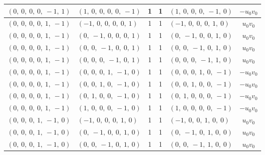 \documentclass[11pt]{article}
\theoremstyle{definition}
\begin{document}
\begin{longtable}{|l|l|c|c|l|c|}
    \hline
    $\left( 0, \  0, \  0, \  0, \  -1, \  1\right)$ & $\left( 1, \  0, \  0, \  0, \  0, \  -1\right)$ & 1 & 1 & $\left( 1, \  0, \  0, \  0, \  -1, \  0\right)$ & $- u_{0} v_{0}$ \\
    \hline
    $\left( 0, \  0, \  0, \  0, \  1, \  -1\right)$ & $\left( -1, \  0, \  0, \  0, \  0, \  1\right)$ & 1 & 1 & $\left( -1, \  0, \  0, \  0, \  1, \  0\right)$ & $u_{0} v_{0}$ \\
    \hline
    $\left( 0, \  0, \  0, \  0, \  1, \  -1\right)$ & $\left( 0, \  -1, \  0, \  0, \  0, \  1\right)$ & 1 & 1 & $\left( 0, \  -1, \  0, \  0, \  1, \  0\right)$ & $u_{0} v_{0}$ \\
    \hline
    $\left( 0, \  0, \  0, \  0, \  1, \  -1\right)$ & $\left( 0, \  0, \  -1, \  0, \  0, \  1\right)$ & 1 & 1 & $\left( 0, \  0, \  -1, \  0, \  1, \  0\right)$ & $u_{0} v_{0}$ \\
    \hline
    $\left( 0, \  0, \  0, \  0, \  1, \  -1\right)$ & $\left( 0, \  0, \  0, \  -1, \  0, \  1\right)$ & 1 & 1 & $\left( 0, \  0, \  0, \  -1, \  1, \  0\right)$ & $u_{0} v_{0}$ \\
    \hline
    $\left( 0, \  0, \  0, \  0, \  1, \  -1\right)$ & $\left( 0, \  0, \  0, \  1, \  -1, \  0\right)$ & 1 & 1 & $\left( 0, \  0, \  0, \  1, \  0, \  -1\right)$ & $- u_{0} v_{0}$ \\
    \hline
    $\left( 0, \  0, \  0, \  0, \  1, \  -1\right)$ & $\left( 0, \  0, \  1, \  0, \  -1, \  0\right)$ & 1 & 1 & $\left( 0, \  0, \  1, \  0, \  0, \  -1\right)$ & $- u_{0} v_{0}$ \\
    \hline
    $\left( 0, \  0, \  0, \  0, \  1, \  -1\right)$ & $\left( 0, \  1, \  0, \  0, \  -1, \  0\right)$ & 1 & 1 & $\left( 0, \  1, \  0, \  0, \  0, \  -1\right)$ & $- u_{0} v_{0}$ \\
    \hline
    $\left( 0, \  0, \  0, \  0, \  1, \  -1\right)$ & $\left( 1, \  0, \  0, \  0, \  -1, \  0\right)$ & 1 & 1 & $\left( 1, \  0, \  0, \  0, \  0, \  -1\right)$ & $- u_{0} v_{0}$ \\
    \hline
    $\left( 0, \  0, \  0, \  1, \  -1, \  0\right)$ & $\left( -1, \  0, \  0, \  0, \  1, \  0\right)$ & 1 & 1 & $\left( -1, \  0, \  0, \  1, \  0, \  0\right)$ & $u_{0} v_{0}$ \\
    \hline
    $\left( 0, \  0, \  0, \  1, \  -1, \  0\right)$ & $\left( 0, \  -1, \  0, \  0, \  1, \  0\right)$ & 1 & 1 & $\left( 0, \  -1, \  0, \  1, \  0, \  0\right)$ & $u_{0} v_{0}$ \\
    \hline
    $\left( 0, \  0, \  0, \  1, \  -1, \  0\right)$ & $\left( 0, \  0, \  -1, \  0, \  1, \  0\right)$ & 1 & 1 & $\left( 0, \  0, \  -1, \  1, \  0, \  0\right)$ & $u_{0} v_{0}$ \\

\end{longtable}
\end{document}

